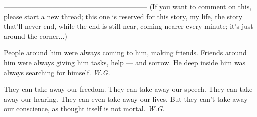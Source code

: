 --------------------------------------------------------------
(If you want to comment on this, please start a new thread; this one is reserved for this story, my life, the story that'll never end, while the end is still near, coming nearer every minute; it's just around the corner...)

People 
around him 
were always coming to him, 
making friends. 
Friends 
around him 
were always giving him tasks, 
help --- and sorrow. 
He 
deep inside him 
was always searching 
for himself. 
\emph{W.G.}

They 
can take away our freedom. 
They 
can take away our speech. 
They 
can take away our hearing. 
They 
can even take away our lives. 
But they 
can't take away our conscience, 
as thought itself is not mortal. 
\emph{W.G.}
